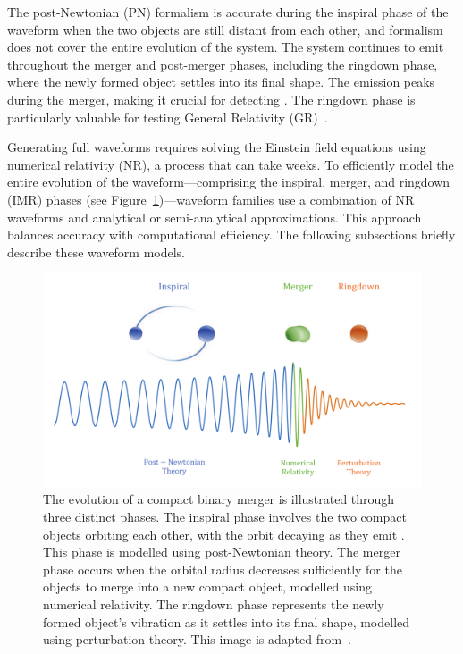 The post-Newtonian (PN) formalism is accurate during the inspiral phase of the waveform when the two objects are still distant from each other, and formalism does not cover the entire evolution of the system. The system continues to emit \gws throughout the merger and post-merger phases, including the ringdown phase, where the newly formed object settles into its final shape. The \gwadj emission peaks during the merger, making it crucial for detecting \gws. The ringdown phase is particularly valuable for testing General Relativity (GR)~\cite{GW150914_TGR:2016, GW170817_TGR:2019, O3_TGR:2021}.

Generating full waveforms requires solving the Einstein field equations using numerical relativity (NR), a process that can take weeks. To efficiently model the entire evolution of the waveform---comprising the inspiral, merger, and ringdown (IMR) phases (see Figure~\ref{1:fig:IMR})---waveform families use a combination of NR waveforms and analytical or semi-analytical approximations. This approach balances accuracy with computational efficiency. The following subsections briefly describe these waveform models.

\begin{figure}
    \centering
    \includegraphics[width=0.75\linewidth]{images/1_general_relativity/modelling_cbc/IMR.pdf}
    \caption{The evolution of a compact binary merger is illustrated through three distinct phases. The inspiral phase involves the two compact objects orbiting each other, with the orbit decaying as they emit \gws. This phase is modelled using post-Newtonian theory. The merger phase occurs when the orbital radius decreases sufficiently for the objects to merge into a new compact object, modelled using numerical relativity. The ringdown phase represents the newly formed object's vibration as it settles into its final shape, modelled using perturbation theory. This image is adapted from~\cite{IMR_plot:2016}.}
    \label{1:fig:IMR}
\end{figure}

